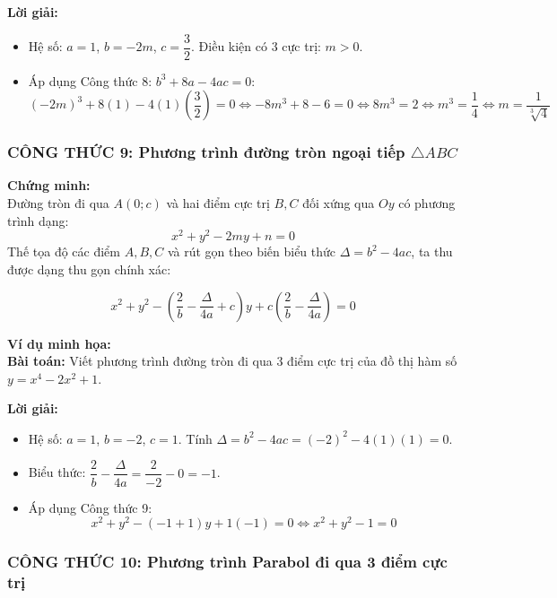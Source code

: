 \begin{itemize}
\noindent \textbf{Lời giải:}
\begin{itemize}
    \item Hệ số: $a = 1$, $b = -2m$, $c = \dfrac{3}{2}$. Điều kiện có 3 cực trị: $m > 0$.
    \item Áp dụng Công thức 8: $b^3 + 8a - 4ac = 0$:
    \[
    (-2m)^3 + 8(1) - 4(1)\left(\frac{3}{2}\right) = 0 \iff -8m^3 + 8 - 6 = 0 \iff 8m^3 = 2 \iff m^3 = \frac{1}{4} \iff m = \frac{1}{\sqrt[3]{4}}
    \]
\end{itemize}


\vspace{0.5cm}

\subsubsection{CÔNG THỨC 9: Phương trình đường tròn ngoại tiếp $\triangle ABC$}

\noindent \textbf{Chứng minh:} \\
Đường tròn đi qua $A(0; c)$ và hai điểm cực trị $B, C$ đối xứng qua $Oy$ có phương trình dạng:
\[
x^2 + y^2 - 2m y + n = 0
\]
Thế tọa độ các điểm $A, B, C$ và rút gọn theo biến biểu thức $\Delta = b^2 - 4ac$, ta thu được dạng thu gọn chính xác:
\begin{tcolorbox}[title=CÔNG THỨC GIẢI NHANH 9]
\[
x^2 + y^2 - \left( \frac{2}{b} - \frac{\Delta}{4a} + c \right)y + c\left( \frac{2}{b} - \frac{\Delta}{4a} \right) = 0
\]
\end{tcolorbox}

\noindent \textbf{Ví dụ minh họa:} \\
\textbf{Bài toán:} Viết phương trình đường tròn đi qua 3 điểm cực trị của đồ thị hàm số $y = x^4 - 2x^2 + 1$.

\noindent \textbf{Lời giải:}
\begin{itemize}
    \item Hệ số: $a = 1$, $b = -2$, $c = 1$. Tính $\Delta = b^2 - 4ac = (-2)^2 - 4(1)(1) = 0$.
    \item Biểu thức: $\dfrac{2}{b} - \dfrac{\Delta}{4a} = \dfrac{2}{-2} - 0 = -1$.
    \item Áp dụng Công thức 9:
    \[
    x^2 + y^2 - (-1 + 1)y + 1(-1) = 0 \iff x^2 + y^2 - 1 = 0
    \]
\end{itemize}


\vspace{0.5cm}

\subsubsection{CÔNG THỨC 10: Phương trình Parabol đi qua 3 điểm cực trị}


\end{itemize}
